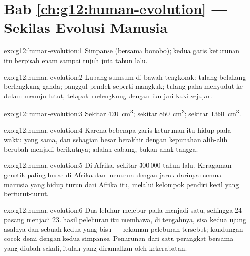 \section*{Bab \ref{ch:g12:human-evolution} --- Sekilas Evolusi Manusia}

\begin{solution}{exo:g12:human-evolution:1}
Simpanse (bersama bonobo); kedua garis keturunan itu berpisah enam
sampai tujuh juta tahun lalu.
\end{solution}

\begin{solution}{exo:g12:human-evolution:2}
Lubang sumsum di bawah tengkorak; tulang belakang berlengkung ganda;
panggul pendek seperti mangkuk; tulang paha menyudut ke dalam menuju
lutut; telapak melengkung dengan ibu jari kaki sejajar.
\end{solution}

\begin{solution}{exo:g12:human-evolution:3}
Sekitar \qty{420}{cm^3}; sekitar \qty{850}{cm^3}; sekitar \qty{1350}{cm^3}.
\end{solution}

\begin{solution}{exo:g12:human-evolution:4}
Karena beberapa  garis keturunan itu hidup pada waktu yang
sama, dan sebagian besar berakhir dengan kepunahan alih-alih berubah
menjadi  berikutnya;  adalah cabang, bukan anak
tangga.
\end{solution}

\begin{solution}{exo:g12:human-evolution:5}
Di Afrika, sekitar 300\,000 tahun lalu. Keragaman genetik paling besar
di Afrika dan menurun dengan jarak darinya: semua manusia yang hidup
turun dari  Afrika itu, melalui kelompok pendiri kecil yang
berturut-turut.
\end{solution}

\begin{solution}{exo:g12:human-evolution:6}
Dua  leluhur melebur pada  menjadi
satu, sehingga 24 pasang menjadi 23.  hasil peleburan itu
membawa, di tengahnya, sisa kedua ujung asalnya dan sebuah 
kedua yang bisu --- rekaman peleburan tersebut; kandungan  cocok
 demi  dengan kedua  simpanse. Penurunan dari satu
perangkat  bersama, yang diubah sekali, itulah yang diramalkan
oleh kekerabatan.
\end{solution}

